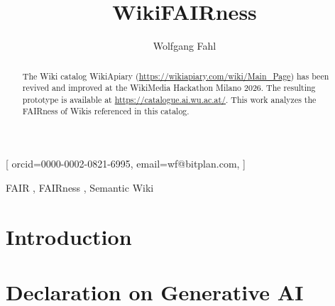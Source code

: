 \documentclass[
]{ceurart}
\begin{document}


\title{WikiFAIRness}

\author[1]{Wolfgang Fahl}[%
orcid=0000-0002-0821-6995,
email=wf@bitplan.com,
]
\cormark[1]
\address[1]{RWTH Aachen University, Computer Science i5, Aachen, Germany}


\begin{abstract}
  The Wiki catalog WikiApiary (\url{https://wikiapiary.com/wiki/Main_Page})
  has been revived and improved at the WikiMedia Hackathon Milano 2026. The
  resulting prototype is available at \url{https://catalogue.ai.wu.ac.at/}.
  This work analyzes the FAIRness of Wikis referenced in this catalog.
\end{abstract}

\begin{keywords}
  FAIR \sep
  FAIRness \sep
  Semantic Wiki
\end{keywords}

\maketitle

\section{Introduction}\label{sec:introduction}

\section*{Declaration on Generative AI}


\end{document}
